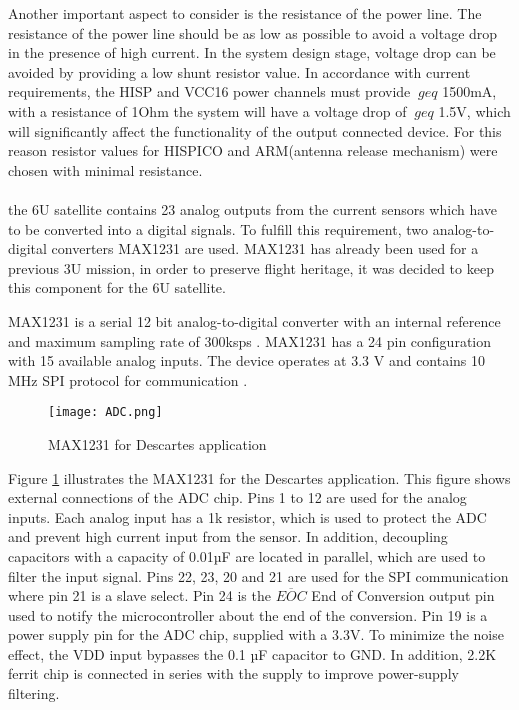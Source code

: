   \label{Tab:res}
 Another important aspect to consider is the resistance of the power line. The resistance of the power line should be as low as possible to avoid a voltage drop in the presence of high current. In the system design stage, voltage drop can be avoided by providing a low shunt resistor value. In accordance with current requirements, the HISP and VCC16 power channels must provide $ \ geq $ 1500mA, with a resistance of 1Ohm the system will have a voltage drop of $ \ geq $ 1.5V, which will significantly affect the functionality of the output connected device.
 For this reason resistor values for HISPICO and ARM(antenna release mechanism) were chosen with minimal resistance.\\ \\ 
 
 the 6U satellite contains 23 analog outputs from the current sensors which have to be converted into a digital signals. To fulfill this requirement, two analog-to-digital converters MAX1231 are used. MAX1231 has already been used for a previous 3U mission, in order to preserve flight heritage, it was decided to keep this component for the 6U satellite.
 
  MAX1231 is a serial 12 bit  analog-to-digital converter with an internal reference and maximum sampling rate of 300ksps . MAX1231 has a 24 pin configuration with 15 available analog inputs. The device operates at 3.3 V and contains 10 MHz SPI protocol for communication \cite{25}.
  
   \begin{figure}[h]
   	\centering
   	\texttt{[image: ADC.png]}
   	\caption{MAX1231 for Descartes application}
   	\label{fig: adc}
   \end{figure} 
 
  Figure \ref{fig: adc} illustrates the MAX1231 for the Descartes application. This figure shows external connections of the ADC chip. Pins 1 to 12 are used for the analog inputs. Each analog input has a 1k resistor, which is used to protect the ADC and prevent high current input from the sensor. In addition, decoupling capacitors with a capacity of 0.01µF are located in parallel, which are used to filter the input signal. Pins 22, 23, 20 and 21 are used for the SPI communication where pin 21 is a slave select. Pin 24 is the $\overline{EOC}$ End of Conversion output pin used to notify the microcontroller about the end of the conversion. Pin 19 is a power supply pin for the ADC chip, supplied with a 3.3V. To minimize the noise effect, the VDD input bypasses the 0.1 µF capacitor to GND. In addition, 2.2K ferrit chip is connected in series with the supply to improve power-supply filtering. 
  
